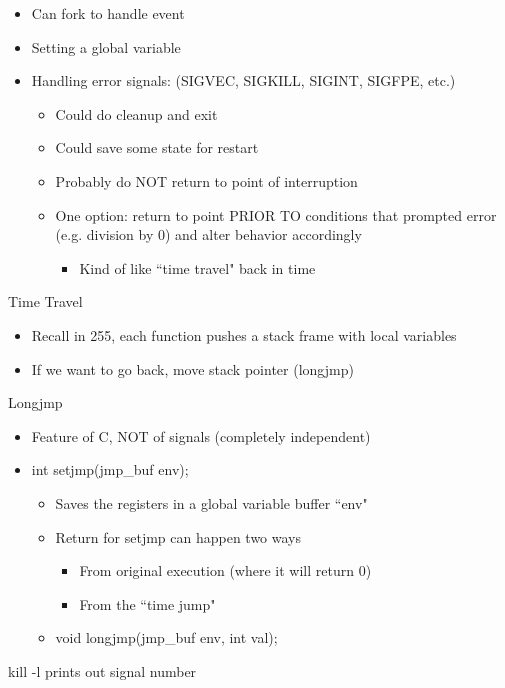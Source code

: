 \begin{itemize}
    \item Can fork to handle event
    \item Setting a global variable
    \item Handling error signals: (SIGVEC, SIGKILL, SIGINT, SIGFPE, etc.)
    \begin{itemize}
        \item Could do cleanup and exit
        \item Could save some state for restart
        \item Probably do NOT return to point of interruption
        \item One option: return to point PRIOR TO conditions that prompted error (e.g. division by 0) and alter behavior accordingly
        \begin{itemize}
            \item Kind of like ``time travel" back in time
        \end{itemize}
    \end{itemize}
\end{itemize}
Time Travel
\begin{itemize}
    \item Recall in 255, each function pushes a stack frame with local variables
    \item If we want to go back, move stack pointer (longjmp)
\end{itemize}
Longjmp
\begin{itemize}
    \item Feature of C, NOT of signals (completely independent)
    \item int setjmp(jmp\_buf env);
    \begin{itemize}
        \item Saves the registers in a global variable buffer ``env"
        \item Return for setjmp can happen two ways
        \begin{itemize}
            \item From original execution (where it will return 0)
            \item From the ``time jump"
        \end{itemize}
        \item void longjmp(jmp\_buf env, int val);
    \end{itemize}
\end{itemize}
kill -l prints out signal number\vspace{0.15in}\\
